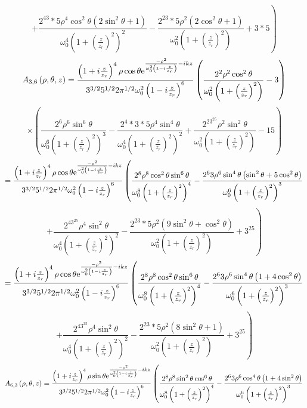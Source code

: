 \documentclass[11pt]{amsart}
\makeatletter
\newcommand{\e}{{\rm e}}				%
\newcommand{\0}{\varnothing}		%
\newcommand{\1}{!}
\newcommand{\2}{@}
\newcommand{\3}{\#}
\newcommand{\4}{\$}
\newcommand{\5}{\%}
\newcommand{\6}{$^\wedge$}
\newcommand{\7}{\&}
\newcommand{\8}{*}
\newcommand{\9}{(}
\makeatother
\begin{document}
\[\left.+\frac{2^43*5\rho^4\cos^2\theta\left(2\sin^2\theta+1\right)}{\omega_0^4\left(1+\left(\frac{z}{z_r}\right)^2\right)^2}-\frac{2^23*5\rho^2\left(2\cos^2\theta+1\right)}{\omega_0^2\left(1+\left(\frac{z}{z_r}\right)^2\right)}+3*5\right)
\]
\[
A_{3,6}\left(\rho,\theta,z\right) = \frac{\left(1+i\frac{z}{z_r}\right)^4\rho\cos \theta\e^{\frac{-\rho^2}{\omega_0^2\left(1-i\frac{z}{z_r}\right)}-ikz}}{3^{3/2}5^{1/2}2\pi^{1/2}\omega_0^2\left(1-i\frac{z}{z_r}\right)^6}\left(\frac{2^2\rho^2\cos^2\theta}{\omega_0^2\left(1+\left(\frac{z}{z_r}\right)^2\right)}-3\right)
\]
\[
\times\left(\frac{2^6\rho^6\sin^6\theta}{\omega_0^6\left(1+\left(\frac{z}{z_r}\right)^2\right)^3}-\frac{2^4*3*5\rho^4 \sin^4\theta}{\omega_0^4\left(1+\left(\frac{z}{z_r}\right)^2\right)^2}+\frac{2^23^25\rho^2\sin^2\theta}{\omega_0^2\left(1+\left(\frac{z}{z_r}\right)^2\right)}-15\right)
\]
\[
= \frac{\left(1+i\frac{z}{z_r}\right)^4\rho\cos \theta\e^{\frac{-\rho^2}{\omega_0^2\left(1-i\frac{z}{z_r}\right)}-ikz}}{3^{3/2}5^{1/2}2\pi^{1/2}\omega_0^2\left(1-i\frac{z}{z_r}\right)^6}\left(\frac{2^8\rho^8\cos^2\theta\sin^6\theta}{\omega_0^8\left(1+\left(\frac{z}{z_r}\right)^2\right)^4}-\frac{2^63\rho^6\sin^4\theta\left(\sin^2 \theta+5\cos^2\theta\right)}{\omega_0^6\left(1+\left(\frac{z}{z_r}\right)^2\right)^3}\right.
\]
\[
\left.+ \frac{2^43^25\rho^4\sin^2\theta}{\omega_0^4\left(1+\left(\frac{z}{z_r}\right)^2\right)^2}-\frac{2^23*5\rho^2\left(9\sin^2\theta+\cos^2\theta\right)}{\omega_0^2\left(1+\left(\frac{z}{z_r}\right)^2\right)}+3^25\right)
\]
\[
= \frac{\left(1+i\frac{z}{z_r}\right)^4\rho\cos \theta\e^{\frac{-\rho^2}{\omega_0^2\left(1-i\frac{z}{z_r}\right)}-ikz}}{3^{3/2}5^{1/2}2\pi^{1/2}\omega_0^2\left(1-i\frac{z}{z_r}\right)^6}\left(\frac{2^8\rho^8\cos^2\theta\sin^6\theta}{\omega_0^8\left(1+\left(\frac{z}{z_r}\right)^2\right)^4}-\frac{2^63\rho^6\sin^4\theta\left(1+4\cos^2\theta\right)}{\omega_0^6\left(1+\left(\frac{z}{z_r}\right)^2\right)^3}\right.
\]
\[
\left.+ \frac{2^43^25\rho^4\sin^2\theta}{\omega_0^4\left(1+\left(\frac{z}{z_r}\right)^2\right)^2}-\frac{2^23*5\rho^2\left(8\sin^2\theta+1\right)}{\omega_0^2\left(1+\left(\frac{z}{z_r}\right)^2\right)}+3^25\right)
\]
\[
A_{6,3}\left(\rho,\theta,z\right) = \frac{\left(1+i\frac{z}{z_r}\right)^4\rho\sin \theta\e^{\frac{-\rho^2}{\omega_0^2\left(1-i\frac{z}{z_r}\right)}-ikz}}{3^{3/2}5^{1/2}2\pi^{1/2}\omega_0^2\left(1-i\frac{z}{z_r}\right)^6}\left(\frac{2^8\rho^8\sin^2\theta\cos^6\theta}{\omega_0^8\left(1+\left(\frac{z}{z_r}\right)^2\right)^4}-\frac{2^63\rho^6\cos^4\theta\left(1+4\sin^2\theta\right)}{\omega_0^6\left(1+\left(\frac{z}{z_r}\right)^2\right)^3}\right.
\]
\end{document}
